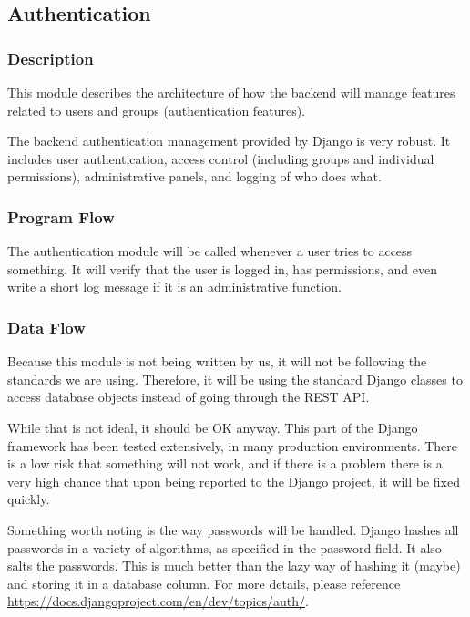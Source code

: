 
\subsection{Authentication}

\subsubsection{Description}

This module describes the architecture of how the backend will manage features related to users and groups (authentication features).

The backend authentication management provided by Django is very robust.
It includes user authentication, access control (including groups and individual permissions), administrative panels, and logging of who does what.


\subsubsection{Program Flow}

The authentication module will be called whenever a user tries to access something.
It will verify that the user is logged in, has permissions, and even write a short log message if it is an administrative function.

\subsubsection{Data Flow}

Because this module is not being written by us, it will not be following the standards we are using.
Therefore, it will be using the standard Django classes to access database objects instead of going through the \ac{REST} \ac{API}.


While that is not ideal, it should be OK anyway.
This part of the Django framework has been tested extensively, in many production environments.
There is a low risk that something will not work, and if there is a problem there is a very high chance that upon being reported to the Django project, it will be fixed quickly.

Something worth noting is the way passwords will be handled.
Django hashes all passwords in a variety of algorithms, as specified in the password field.
It also salts the passwords.
This is much better than the lazy way of hashing it (maybe) and storing it in a database column.
For more details, please reference \url{https://docs.djangoproject.com/en/dev/topics/auth/}.

